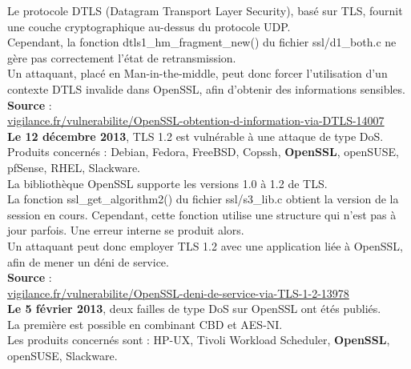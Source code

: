 \documentclass{article}
\begin{document}
	Le protocole DTLS (Datagram Transport Layer Security), basé sur TLS, fournit 
	une couche cryptographique au-dessus du protocole UDP.\\

	Cependant, la fonction dtls1\_hm\_fragment\_new() du fichier ssl/d1\_both.c 
	ne gère pas correctement l'état de retransmission.\\

	Un attaquant, placé en Man-in-the-middle, peut donc forcer l'utilisation 
	d'un contexte DTLS invalide dans OpenSSL, afin d'obtenir des informations sensibles.\\

	\textbf{Source} : \\
	\href{http://vigilance.fr/vulnerabilite/OpenSSL-obtention-d-information-via-DTLS-14007}
	{vigilance.fr/vulnerabilite/OpenSSL-obtention-d-information-via-DTLS-14007}\\

	\textbf{Le 12 décembre 2013}, TLS 1.2 est vulnérable à une attaque de type DoS.\\
	
	Produits concernés : Debian, Fedora, FreeBSD, Copssh, \textbf{OpenSSL}, 
	openSUSE, pfSense, RHEL, Slackware.\\

	La bibliothèque OpenSSL supporte les versions 1.0 à 1.2 de TLS.\\

	La fonction ssl\_get\_algorithm2() du fichier ssl/s3\_lib.c obtient la 
	version de la session en cours. Cependant, cette fonction utilise 
	une structure qui n'est pas à jour parfois. Une erreur interne se produit alors.\\

	Un attaquant peut donc employer TLS 1.2 avec une application liée à OpenSSL, 
	afin de mener un déni de service.\\
	
	\textbf{Source} : \\
	\href{http://vigilance.fr/vulnerabilite/OpenSSL-deni-de-service-via-TLS-1-2-13978}
	{vigilance.fr/vulnerabilite/OpenSSL-deni-de-service-via-TLS-1-2-13978}\\

	\textbf{Le 5 février 2013}, deux failles de type DoS sur OpenSSL ont étés publiés.\\
	La première est possible en combinant CBD et AES-NI.\\
	Les produits concernés sont : HP-UX, Tivoli Workload Scheduler, 
	\textbf{OpenSSL}, openSUSE, Slackware.\\
	
\end{document}
